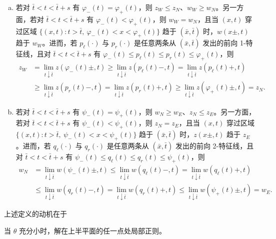 \documentclass[../../main.tex]{subfiles}
\begin{document}
\begin{definition}[局部正则]
\begin{enumerate}[(a)]
\begin{align}
&\leqslant\lim_{t\uparrow\bar t}z(q_r(t)-,t)\leqslant\lim_{t\uparrow\bar t}z(q_r(t)+,t)\leqslant\lim_{t\uparrow\bar t}z(\zeta_+(t)\pm,t)=z_S.
\label{align:ch12-正则2z}
\end{align}
\item\label{item:ch12-局部正则-c1} 若对 $\bar t<t<\bar t+s$ 有 $\varphi_-(t)=\varphi_+(t)$，则 $z_W\leqslant z_N$、$w_W\geqslant w_N$。另一方面，若对 $\bar t<t<\bar t+s$ 有 $\varphi_-(t)<\varphi_+(t)$，则 $w_W=w_N$，且当 $(x,t)$ 穿过区域 $\{(x,t):t>\bar t,\ \varphi_-(t)<x<\varphi_+(t)\}$ 趋于 $(\bar x,\bar t)$ 时，$w(x\pm,t)$ 趋于 $w_W$。进而，若 $p_\ell(\cdot)$ 与 $p_r(\cdot)$ 是任意两条从 $(\bar x,\bar t)$ 发出的前向 1-特征线，且对 $\bar t<t<\bar t+s$ 有 $\varphi_-(t)\leqslant p_\ell(t)\leqslant p_r(t)\leqslant\varphi_+(t)$，则
\begin{align}
z_W&=\lim_{t\downarrow\bar t}z(\varphi_-(t)\pm,t)\geqslant\lim_{t\downarrow\bar t}z(p_\ell(t)-,t)=\lim_{t\downarrow\bar t}z(p_\ell(t)+,t)\nonumber\\
&\geqslant\lim_{t\downarrow\bar t}z(p_r(t)-,t)=\lim_{t\downarrow\bar t}z(p_r(t)+,t)\geqslant\lim_{t\downarrow\bar t}z(\varphi_+(t)\pm,t)=z_N.
\label{align:ch12-正则3z}
\end{align}
\item\label{item:ch12-局部正则-c2} 若对 $\bar t<t<\bar t+s$ 有 $\psi_-(t)=\psi_+(t)$，则 $w_N\geqslant w_E$、$z_N\leqslant z_E$。另一方面，若对 $\bar t<t<\bar t+s$ 有 $\psi_-(t)<\psi_+(t)$，则 $z_N=z_E$，且当 $(x,t)$ 穿过区域 $\{(x,t):t>\bar t,\ \psi_-(t)<x<\psi_+(t)\}$ 趋于 $(\bar x,\bar t)$ 时，$z(x\pm,t)$ 趋于 $z_E$。进而，若 $q_\ell(\cdot)$ 与 $q_r(\cdot)$ 是任意两条从 $(\bar x,\bar t)$ 发出的前向 2-特征线，且对 $\bar t<t<\bar t+s$ 有 $\psi_-(t)\leqslant q_\ell(t)\leqslant q_r(t)\leqslant\psi_+(t)$，则
\begin{align}
w_N&=\lim_{t\downarrow\bar t}w(\psi_-(t)\pm,t)\leqslant\lim_{t\downarrow\bar t}w(q_\ell(t)-,t)=\lim_{t\downarrow\bar t}w(q_\ell(t)+,t)\nonumber\\
&\leqslant\lim_{t\downarrow\bar t}w(q_r(t)-,t)=\lim_{t\downarrow\bar t}w(q_r(t)+,t)\leqslant\lim_{t\downarrow\bar t}w(\psi_+(t)\pm,t)=w_E.
\label{align:ch12-正则4w}
\end{align}
\end{enumerate}
\end{definition}

上述定义的动机在于

\begin{theorem}\label{theorem:ch12-局部正则存在}
当 $\theta$ 充分小时，解在上半平面的任一点处局部正则。
\end{theorem}
\end{document}
